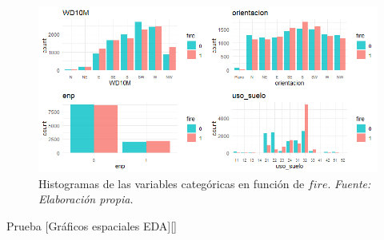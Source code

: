 \documentclass[12pt,a4paper,]{book}
\numberwithin{dummy}{section}
\theoremstyle{ocrenumbox}
\theoremstyle{blacknumex}
\theoremstyle{blacknumbox}
\theoremstyle{ocrenum}
\theoremstyle{ocrenum}
\begin{document}
\begin{figure}[]
\centering
\includegraphics[width =\textwidth]{graficos/histogramas.png}
\caption[Histogramas de las variables categóricas en función de $fire$]{Histogramas de las variables categóricas en función de $fire$. \it Fuente: Elaboración propia.}
\label{fig:histogramas}
\end{figure}

Prueba {[}Gráficos espaciales EDA{]}{[}{]}




%
\end{document}
